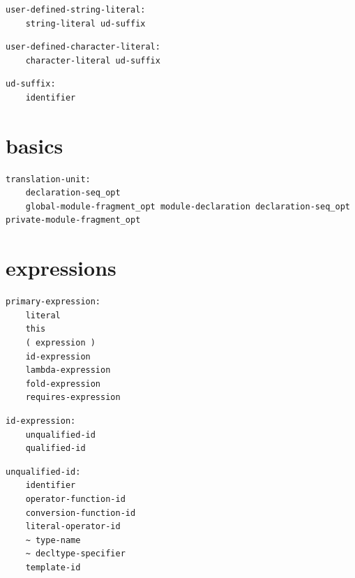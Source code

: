 \noindent\textbf{\texttt{}}\par
\begin{lstlisting}
user-defined-string-literal:
    string-literal ud-suffix
\end{lstlisting}

\noindent\textbf{\texttt{}}\par
\begin{lstlisting}
user-defined-character-literal:
    character-literal ud-suffix
\end{lstlisting}

\noindent\textbf{\texttt{}}\par
\begin{lstlisting}
ud-suffix:
    identifier
\end{lstlisting}

\section{basics}

\noindent\textbf{\texttt{}}\par
\begin{lstlisting}
translation-unit:
    declaration-seq_opt
    global-module-fragment_opt module-declaration declaration-seq_opt private-module-fragment_opt
\end{lstlisting}

\section{expressions}

\noindent\textbf{\texttt{}}\par
\begin{lstlisting}
primary-expression:
    literal
    this
    ( expression )
    id-expression
    lambda-expression
    fold-expression
    requires-expression
\end{lstlisting}

\noindent\textbf{\texttt{}}\par
\begin{lstlisting}
id-expression:
    unqualified-id
    qualified-id
\end{lstlisting}

\noindent\textbf{\texttt{}}\par
\begin{lstlisting}
unqualified-id:
    identifier
    operator-function-id
    conversion-function-id
    literal-operator-id
    ~ type-name
    ~ decltype-specifier
    template-id
\end{lstlisting}

